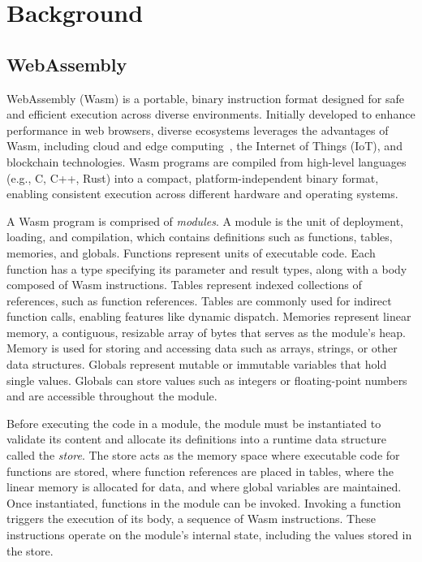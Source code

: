 
\chapter{Background} \label{ch:background} \noindent

\section{WebAssembly} \label{sec:webassembly}

WebAssembly (Wasm) is a portable, binary instruction format designed for safe
and efficient execution across diverse environments.
Initially developed to enhance performance in web browsers, diverse ecosystems
leverages the advantages of Wasm, including cloud and edge
computing~\cite{lucet, cloudflare}, the Internet of Things (IoT)\cite{wasm-iot}, and
blockchain technologies\cite{wasm-blockchain}.
Wasm programs are compiled from high-level languages (e.g., C, C++, Rust) into
a compact, platform-independent binary format, enabling consistent execution
across different hardware and operating systems.


A Wasm program is comprised of \textit{modules}.
A module is the unit of deployment, loading, and compilation, which contains
definitions such as functions, tables, memories, and globals.
Functions represent units of executable code.
Each function has a type specifying its parameter and result types, along with
a body composed of Wasm instructions.
Tables represent indexed collections of references, such as function
references.
Tables are commonly used for indirect function calls, enabling features like
dynamic dispatch.
Memories represent linear memory, a contiguous, resizable array of bytes that
serves as the module’s heap.
Memory is used for storing and accessing data such as arrays, strings, or other
data structures.
Globals represent mutable or immutable variables that hold single values.
Globals can store values such as integers or floating-point numbers and are
accessible throughout the module.


Before executing the code in a module, the module must be instantiated to
validate its content and allocate its definitions into a runtime data structure
called the \textit{store}.
The store acts as the memory space where executable code for functions are
stored, where function references are placed in tables, where the linear memory
is allocated for data, and where global variables are maintained.
Once instantiated, functions in the module can be invoked.
Invoking a function triggers the execution of its body, a sequence of
Wasm instructions.
These instructions operate on the module’s internal state, including the values
stored in the store.


